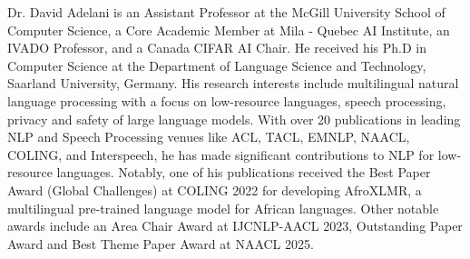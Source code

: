 Dr. David Adelani is an Assistant Professor at the McGill University School of Computer Science, a Core Academic Member at Mila - Quebec AI Institute, an IVADO Professor, and a Canada CIFAR AI Chair. He received his Ph.D in Computer Science at the Department of Language Science and Technology, Saarland University, Germany. His research interests include multilingual natural language processing with a focus on low-resource languages, speech processing, privacy and safety of large language models. With over 20 publications in leading NLP and Speech Processing venues like ACL, TACL, EMNLP, NAACL, COLING, and Interspeech, he has made significant contributions to NLP for low-resource languages. Notably, one of his publications received the Best Paper Award (Global Challenges) at COLING 2022 for developing AfroXLMR, a multilingual pre-trained language model for African languages. Other notable awards include an Area Chair Award at IJCNLP-AACL 2023, Outstanding Paper Award and Best Theme Paper Award at NAACL 2025.